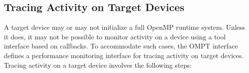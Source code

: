 \begin{comment}
\item \code{ompt\_callback\_destroy\_lock}, see \specref
\item \code{ompt\_callback\_mutex\_acquire}, see \specref
\item \code{ompt\_callback\_mutex\_acquired}, see \specref
\item \code{ompt\_callback\_nest\_lock}, see ...
\item \code{ompt\_callback\_flush}, see \specref{subsec:flush Construct}.
\item \code{ompt\_callback\_device\_initialize}, see \specref{sec:Device Constructs}.
\item \code{ompt\_callback\_cancel}, see \specref{sec:Cancellation Constructs}.
\end{itemize}
\end{comment}


\subsection{Tracing Activity on Target Devices}
\label{sec:tracing-device-activity}

A target device may or may not initialize a full OpenMP runtime system.
Unless it does, it may not be possible to monitor activity 
on a device using a tool interface based on callbacks.
To accommodate such cases, the OMPT interface defines 
a performance monitoring interface for tracing activity on target
devices. Tracing activity on a target device involves the following
steps:

